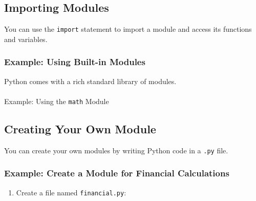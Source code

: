 \documentclass[
  letterpaper,
  DIV=11,
  numbers=noendperiod]{scrreprt}
\makeatletter
\let\oldparagraph\paragraph
\renewcommand{\paragraph}{
    \@ifstar
      \xxxParagraphStar
      \xxxParagraphNoStar
  }
\newcommand{\xxxParagraphStar}[1]{\oldparagraph*{#1}\mbox{}}
\newcommand{\xxxParagraphNoStar}[1]{\oldparagraph{#1}\mbox{}}
\newenvironment{Shaded}{\begin{snugshade}}{\end{snugshade}}
\newcommand{\BuiltInTok}[1]{\textcolor[rgb]{0.00,0.23,0.31}{#1}}
\newcommand{\CommentTok}[1]{\textcolor[rgb]{0.37,0.37,0.37}{#1}}
\newcommand{\FloatTok}[1]{\textcolor[rgb]{0.68,0.00,0.00}{#1}}
\newcommand{\ImportTok}[1]{\textcolor[rgb]{0.00,0.46,0.62}{#1}}
\newcommand{\NormalTok}[1]{\textcolor[rgb]{0.00,0.23,0.31}{#1}}
\newcommand{\OperatorTok}[1]{\textcolor[rgb]{0.37,0.37,0.37}{#1}}
\newcommand{\SpecialCharTok}[1]{\textcolor[rgb]{0.37,0.37,0.37}{#1}}
\newcommand{\SpecialStringTok}[1]{\textcolor[rgb]{0.13,0.47,0.30}{#1}}
\providecommand{\tightlist}{%
  \setlength{\itemsep}{0pt}\setlength{\parskip}{0pt}}\usepackage{longtable,booktabs,array}
\makeatother
\begin{document}
\subsection{Importing Modules}\label{importing-modules-2}

You can use the \texttt{import} statement to import a module and access
its functions and variables.

\subsubsection{Example: Using Built-in
Modules}\label{example-using-built-in-modules}

Python comes with a rich standard library of modules.

\paragraph{\texorpdfstring{Example: Using the \texttt{math}
Module}{Example: Using the math Module}}\label{example-using-the-math-module}

\begin{Shaded}
\end{Shaded}

\subsection{Creating Your Own Module}\label{creating-your-own-module}

You can create your own modules by writing Python code in a \texttt{.py}
file.

\subsubsection{Example: Create a Module for Financial
Calculations}\label{example-create-a-module-for-financial-calculations}

\begin{enumerate}
\def\labelenumi{\arabic{enumi}.}
\tightlist
\item
  Create a file named \texttt{financial.py}:
\end{enumerate}
\end{document}
